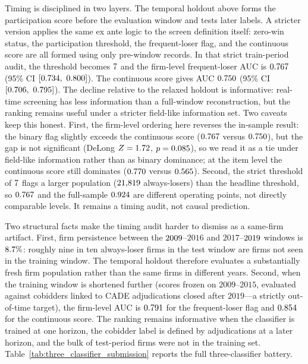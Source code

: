Timing is disciplined in two layers. The temporal holdout above
forms the participation score before the evaluation window and
tests later labels. A stricter version applies the same ex ante
logic to the screen definition itself: zero-win status, the
participation threshold, the frequent-loser flag, and the
continuous score are all formed using only pre-window records.
In that strict train-period audit, the threshold becomes
$7$ and the firm-level frequent-loser AUC is
$0.767$ (95\% CI $[0.734,\ 0.800]$). The
continuous score gives AUC $0.750$ (95\% CI
$[0.706,\ 0.795]$). The decline relative to the relaxed
holdout is informative: real-time screening has less information
than a full-window reconstruction, but the ranking remains
useful under a stricter field-like information set.
Two caveats keep this honest. First, the firm-level ordering here
reverses the in-sample result: the binary flag slightly exceeds
the continuous score ($0.767$ versus
$0.750$), but the gap is not significant (DeLong
$Z=1.72$, $p=0.085$), so we read it as a
tie under field-like information rather than as binary dominance;
at the item level the continuous score still dominates
($0.770$ versus $0.565$). Second, the
strict threshold of $7$ flags a larger
population ($21{,}819$ always-losers) than the headline
threshold, so $0.767$ and the full-sample
$0.924$ are different operating points, not directly
comparable levels. It remains a timing audit, not causal
prediction.

Two structural facts make the timing audit harder to dismiss as
a same-firm artifact. First, firm persistence between the
$2009$--$2016$ and $2017$--$2019$ windows is
$8.7\%$: roughly nine in ten always-loser firms in the
test window are firms not seen in the training window. The
temporal holdout therefore evaluates a substantially fresh firm
population rather than the same firms in different years. Second,
when the training window is shortened further (scores frozen on
$2009$--$2015$, evaluated against cobidders linked to CADE
adjudications closed after $2019$---a strictly out-of-time
target), the firm-level AUC is $0.791$ for the
frequent-loser flag and $0.854$ for the
continuous score. The ranking remains informative when the
classifier is trained at one horizon, the cobidder label is
defined by adjudications at a later horizon, and the bulk of
test-period firms were not in the training set.
Table~\ref{tab:three_classifier_submission} reports the full
three-classifier battery.

